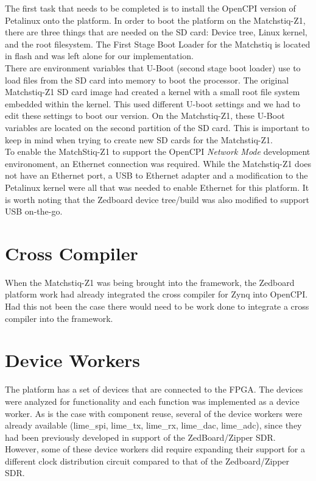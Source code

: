 \noindent The first task that needs to be completed is to install the OpenCPI version of Petalinux onto the platform.  In order to boot the platform on the Matchstiq-Z1, there are three things that are needed on the SD card: Device tree, Linux kernel, and the root filesystem.  The First Stage Boot Loader for the Matchstiq is located in flash and was left alone for our implementation.\\

\noindent There are environment variables that U-Boot (second stage boot loader) use to load files from the SD card into memory to boot the processor.  The original Matchstiq-Z1 SD card image had created a kernel with a small root file system embedded within the kernel. This used different U-boot settings and we had to edit these settings to boot our version. On the Matchstiq-Z1, these U-Boot variables are located on the second partition of the SD card. This is important to keep in mind when trying to create new SD cards for the Matchstiq-Z1. \\

\noindent To enable the MatchStiq-Z1 to support the OpenCPI \textit{Network Mode} development environoment, an Ethernet connection was required.  While the Matchstiq-Z1 does not have an Ethernet port,  a USB to Ethernet adapter and a modification to the Petalinux kernel were all that was needed to enable Ethernet for this platform. It is worth noting that the Zedboard device tree/build was also modified to support USB on-the-go.

\section{Cross Compiler}

When the Matchstiq-Z1 was being brought into the framework, the Zedboard platform work had already integrated the cross compiler for Zynq into OpenCPI.  Had this not been the case there would need to be work done to integrate a cross compiler into the framework.

\section{Device Workers}
The platform has a set of devices that are connected to the FPGA.  The devices were analyzed for functionality and each function was implemented as a device worker. As is the case with component reuse, several of the device workers were already available (lime\_spi, lime\_tx, lime\_rx, lime\_dac, lime\_adc), since they had been previously developed in support of the ZedBoard/Zipper SDR. However, some of these device workers did require expanding their support for a different clock distribution circuit compared to that of the Zedboard/Zipper SDR.

